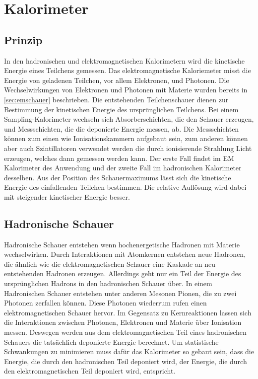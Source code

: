 \section{Kalorimeter}\label{sec:calori}
\subsection{Prinzip}
In den hadronischen und elektromagnetischen Kalorimetern wird die kinetische Energie eines Teilchens gemessen. Das elektromagnetische Kaloriemeter misst die Energie von geladenen Teilchen, vor allem Elektronen, und Photonen. Die Wechselwirkungen von Elektronen und Photonen mit Materie wurden bereits in \ref{sec:emschauer} beschrieben. Die entstehenden Teilchenschauer dienen zur Bestimmung der kinetischen Energie des ursprünglichen Teilchens. Bei einem Sampling-Kalorimeter wechseln sich Absorberschichten, die den Schauer erzeugen, und Messschichten, die die deponierte Energie messen, ab. Die Messschichten können zum einen wie Ionisationskammern aufgebaut sein, zum anderen können aber auch Szintillatoren verwendet werden die durch ionisierende Strahlung Licht erzeugen, welches dann gemessen werden kann. Der erste Fall findet im EM Kalorimeter des \atlas Anwendung und der zweite Fall im hadronischen Kalorimeter desselben. Aus der Position des Schauermaximums lässt sich die kinetische Energie des einfallenden Teilchen bestimmen. 
Die relative Auflösung wird dabei mit steigender kinetischer Energie besser.
\subsection{Hadronische Schauer}
Hadronische Schauer entstehen wenn hochenergetische Hadronen mit Materie wechselwirken. Durch Interaktionen mit Atomkernen entstehen neue Hadronen, die ähnlich wie die elektromagnetischen Schauer eine Kaskade an neu entstehenden Hadronen erzeugen. Allerdings geht nur ein Teil der Energie des ursprünglichen Hadrons in den hadronischen Schauer über. In einem Hadronischen Schauer entstehen unter anderen Mesonen Pionen, die zu zwei Photonen zerfallen können. Diese Photonen wiederrum rufen einen elektromagnetischen Schauer hervor. Im Gegensatz zu Kernreaktionen lassen sich die Interaktionen zwischen Photonen, Elektronen und Materie über Ionisation messen. Deswegen werden aus dem elektromagnetischen Teil eines hadronischen Schauers die tatsächlich deponierte Energie berechnet. Um statistische Schwankungen zu minimieren muss dafür das Kalorimeter so gebaut sein, dass die Energie, die durch den hadronischen Teil deponiert wird, der Energie, die durch den elektromagnetischen Teil deponiert wird, entspricht.


